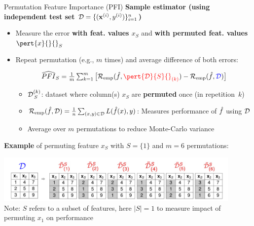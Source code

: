 \documentclass[10pt,compress,t,notes=noshow, xcolor=table]{beamer}
\begin{document}
\begin{frame}{Permutation Feature Importance (PFI) }
\textbf{Sample estimator (using independent test set $\mathcal{D}=\{(\mathbf{x}^{(i)},y^{(i)})\}_{i=1}^{n}$)}

\begin{itemize}
  \item Measure the error {\color{blue}\textbf{with feat. values $x_S$}} and {\color{red}\textbf{with permuted feat. values $\pert{x}{}{}_S$}} 
  \item Repeat permutation (e.g., $m$ times) and average difference of both errors: 

$$
\widehat{PFI}_S = \tfrac{1}{m}  \textstyle\sum\nolimits_{k = 1}^{m} \big[ \riske (\fh, {\color{red}\pert{\D}{S}{}_{(k)}}) - \riske (\fh, {\color{blue}\D}) \big]
$$

\begin{itemize}
  \item $\mathcal{D}^{(k)}_{\,S}$: dataset where column(s) $x_S$ are \textbf{permuted} once (in repetition\ $k$)  
  \item $\mathcal{R}_{\text{emp}}(\hat{f}, \mathcal{D}) = \frac{1}{n} \sum\nolimits_{(x, y) \in \mathcal{D}}  L(\hat{f}(x), y)$: Measures performance of $\hat{f}$ using $\mathcal{D}$
  \item Average over $m$ permutations to reduce Monte-Carlo variance
\end{itemize}
\end{itemize}

\medskip

\textbf{Example} of permuting feature $x_S$ with $S = \{1\}$ and $m=6$ permutations:

\centering 
\includegraphics[width=0.9\textwidth]{figure_man/permuted-fv.pdf}\\
{\scriptsize
Note: $S$ refers to a subset of features, here $|S|=1$ to measure impact of permuting $x_1$ on performance
}
\end{frame}


\end{document}
